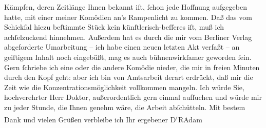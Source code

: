 \begin{ledgroupsized}[t]{13cm}
                    Kämpfen, deren Zeitlänge Ihnen bekannt iſt, ſchon jede Hoffnung aufgegeben
                    hatte, mit einer meiner Komödien an’s Rampenlicht zu kommen. Daß das vom
                    Schickſal hiezu beſtimmte Stück kein künſtlerisch-beſſeres iſt, muß ich achſelzuckend hinnehmen.
                    Außerdem hat es durch die mir vom Berliner Verlag abgeforderte
                    Umarbeitung – ich habe einen neuen letzten Akt verfaßt – an geiſtigem Inhalt
                    noch eingebüßt, mag es auch bühnenwirkſamer geworden ſein.\pend
           \pstart
           Gern ſchriebe ich eine oder die andere Komödie {\pb}nieder, die mir in freien Minuten
                    durch den Kopf geht: aber ich bin von Amtsarbeit derart erdrückt, daß mir die
                    Zeit wie die Konzentrationsmöglichkeit vollkommen mangeln.\pend
           \pstart
           Ich würde Sie, hochverehrter Herr Doktor, außerordentlich gern einmal aufſuchen
                    und würde mir zu jeder Stunde, die Ihnen genehm wäre, die Arbeit
                    abſchütteln.\pend
           \pstart
           Mit bestem Dank und vielen Grüßen verbleibe ich Ihr ergebener\pend
           \pstart \spacefill\mbox{D\textsuperscript{r}RAdam}\pend{}\endnumbering{}\end{ledgroupsized}  \newcommand{\dateiname}{L02538}\newcommand{\titel}{Robert Adam an Arthur Schnitzler, 15. 6. 1930}\newcommand{\editorInnen}{Martin Anton Müller und Gerd-Hermann Susen}
      